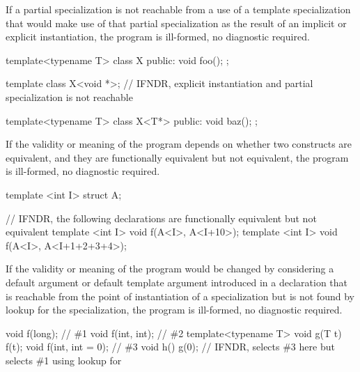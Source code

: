 
\pnum
If a partial specialization
is not reachable from a use of a template specialization
that would make use of that partial specialization
as the result of an implicit or explicit instantiation,
the program is ill-formed, no diagnostic required.

\pnum
\begin{example}
\begin{codeblock}
template<typename T> class X{
public:
  void foo(){};
};

template class X<void *>;       // IFNDR, explicit instantiation and partial specialization is not reachable

template<typename T> class X<T*>{
public:
  void baz();
};
\end{codeblock}
\end{example}


\pnum
If the validity or meaning of the program
depends on whether two constructs are equivalent,
and they are functionally equivalent but not equivalent,
the program is ill-formed, no diagnostic required.

\pnum
\begin{example}
\begin{codeblock}
template <int I>
struct A{};

// IFNDR, the following declarations are functionally equivalent but not equivalent
template <int I> void f(A<I>, A<I+10>);
template <int I> void f(A<I>, A<I+1+2+3+4>);
\end{codeblock}
\end{example}


\pnum
If the validity or meaning of the program
would be changed by considering
a default argument or default template argument
introduced in a declaration that is reachable
from the point of instantiation of a specialization
but is not found by lookup for the specialization,
the program is ill-formed, no diagnostic required.

\pnum
\begin{example}
\begin{codeblock}
void f(long);           // \#1
void f(int, int);       // \#2
template<typename T> void g(T t) { f(t); }
void f(int, int = 0);   // \#3
void h() { g(0); }      // IFNDR, selects \#3 here but selects \#1 using lookup for 
\end{codeblock}
\end{example}

